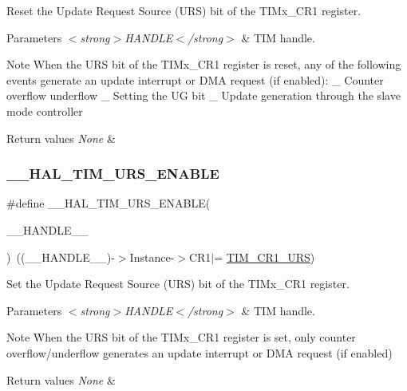 Reset the Update Request Source (U\+RS) bit of the T\+I\+Mx\+\_\+\+C\+R1 register. 


\begin{DoxyParams}{Parameters}
{\em $<$strong$>$\+H\+A\+N\+D\+L\+E$<$/strong$>$} & T\+IM handle. \\
\hline
\end{DoxyParams}
\begin{DoxyNote}{Note}
When the U\+RS bit of the T\+I\+Mx\+\_\+\+C\+R1 register is reset, any of the following events generate an update interrupt or D\+MA request (if enabled)\+: \+\_\+ Counter overflow underflow \+\_\+ Setting the UG bit \+\_\+ Update generation through the slave mode controller 
\end{DoxyNote}

\begin{DoxyRetVals}{Return values}
{\em None} & \\
\hline
\end{DoxyRetVals}
\mbox{\label{group___t_i_m___exported___macros_ga3b06856bd6d7e10cfff342b1726db51d}} 
\subsubsection{\texorpdfstring{\+\_\+\+\_\+\+H\+A\+L\+\_\+\+T\+I\+M\+\_\+\+U\+R\+S\+\_\+\+E\+N\+A\+B\+LE}{\_\_HAL\_TIM\_URS\_ENABLE}}
{\footnotesize\ttfamily \#define \+\_\+\+\_\+\+H\+A\+L\+\_\+\+T\+I\+M\+\_\+\+U\+R\+S\+\_\+\+E\+N\+A\+B\+LE(\begin{DoxyParamCaption}\item[{}]{\+\_\+\+\_\+\+H\+A\+N\+D\+L\+E\+\_\+\+\_\+ }\end{DoxyParamCaption})~((\+\_\+\+\_\+\+H\+A\+N\+D\+L\+E\+\_\+\+\_\+)-\/$>$Instance-\/$>$C\+R1$\vert$= \hyperlink{group___peripheral___registers___bits___definition_ga06c997c2c23e8bef7ca07579762c113b}{T\+I\+M\+\_\+\+C\+R1\+\_\+\+U\+RS})}



Set the Update Request Source (U\+RS) bit of the T\+I\+Mx\+\_\+\+C\+R1 register. 


\begin{DoxyParams}{Parameters}
{\em $<$strong$>$\+H\+A\+N\+D\+L\+E$<$/strong$>$} & T\+IM handle. \\
\hline
\end{DoxyParams}
\begin{DoxyNote}{Note}
When the U\+RS bit of the T\+I\+Mx\+\_\+\+C\+R1 register is set, only counter overflow/underflow generates an update interrupt or D\+MA request (if enabled) 
\end{DoxyNote}

\begin{DoxyRetVals}{Return values}
{\em None} & \\
\hline
\end{DoxyRetVals}
